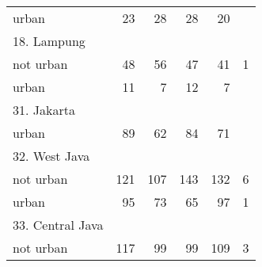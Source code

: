 \begin{table}[!h]
\begin{tabular}{llllll}
\multicolumn{1}{l}{\hspace{1em}urban} &
  \multicolumn{1}{|r}{23} &
  \multicolumn{1}{r}{28} &
  \multicolumn{1}{r}{28} &
  \multicolumn{1}{r}{20} &
  \multicolumn{1}{r}{} \\
\multicolumn{1}{l}{18. Lampung} &
  \multicolumn{1}{|r}{} &
  \multicolumn{1}{r}{} &
  \multicolumn{1}{r}{} &
  \multicolumn{1}{r}{} &
  \multicolumn{1}{r}{} \\
\multicolumn{1}{l}{\hspace{1em}not urban} &
  \multicolumn{1}{|r}{48} &
  \multicolumn{1}{r}{56} &
  \multicolumn{1}{r}{47} &
  \multicolumn{1}{r}{41} &
  \multicolumn{1}{r}{1} \\
\multicolumn{1}{l}{\hspace{1em}urban} &
  \multicolumn{1}{|r}{11} &
  \multicolumn{1}{r}{7} &
  \multicolumn{1}{r}{12} &
  \multicolumn{1}{r}{7} &
  \multicolumn{1}{r}{} \\
\multicolumn{1}{l}{31. Jakarta} &
  \multicolumn{1}{|r}{} &
  \multicolumn{1}{r}{} &
  \multicolumn{1}{r}{} &
  \multicolumn{1}{r}{} &
  \multicolumn{1}{r}{} \\
\multicolumn{1}{l}{\hspace{1em}urban} &
  \multicolumn{1}{|r}{89} &
  \multicolumn{1}{r}{62} &
  \multicolumn{1}{r}{84} &
  \multicolumn{1}{r}{71} &
  \multicolumn{1}{r}{} \\
\multicolumn{1}{l}{32. West Java} &
  \multicolumn{1}{|r}{} &
  \multicolumn{1}{r}{} &
  \multicolumn{1}{r}{} &
  \multicolumn{1}{r}{} &
  \multicolumn{1}{r}{} \\
\multicolumn{1}{l}{\hspace{1em}not urban} &
  \multicolumn{1}{|r}{121} &
  \multicolumn{1}{r}{107} &
  \multicolumn{1}{r}{143} &
  \multicolumn{1}{r}{132} &
  \multicolumn{1}{r}{6} \\
\multicolumn{1}{l}{\hspace{1em}urban} &
  \multicolumn{1}{|r}{95} &
  \multicolumn{1}{r}{73} &
  \multicolumn{1}{r}{65} &
  \multicolumn{1}{r}{97} &
  \multicolumn{1}{r}{1} \\
\multicolumn{1}{l}{33. Central Java} &
  \multicolumn{1}{|r}{} &
  \multicolumn{1}{r}{} &
  \multicolumn{1}{r}{} &
  \multicolumn{1}{r}{} &
  \multicolumn{1}{r}{} \\
\multicolumn{1}{l}{\hspace{1em}not urban} &
  \multicolumn{1}{|r}{117} &
  \multicolumn{1}{r}{99} &
  \multicolumn{1}{r}{99} &
  \multicolumn{1}{r}{109} &
  \multicolumn{1}{r}{3} \\

\end{tabular}
\end{table}

